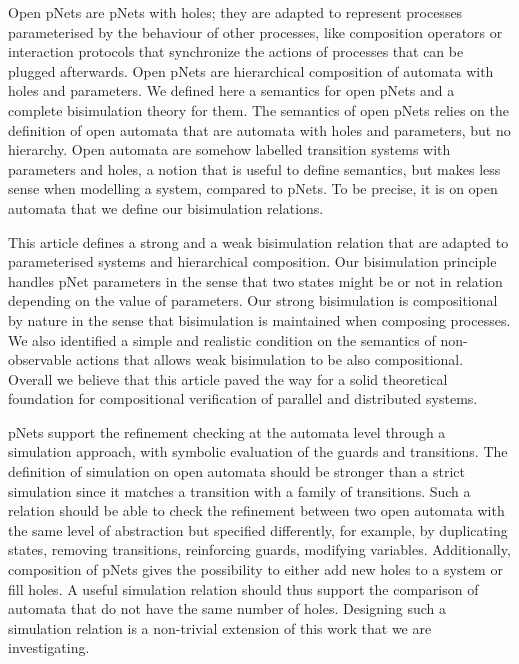 \documentclass{lmcs}
\begin{document}
Open pNets are pNets with holes; they are adapted to represent processes parameterised by the behaviour of other processes, like composition operators or interaction 
protocols that synchronize the actions of processes that can be plugged afterwards. Open
pNets are hierarchical composition of automata with holes and parameters. We
defined here a semantics for open pNets and a complete bisimulation theory for them. 
The semantics of open pNets relies on the definition of open automata that are automata with holes and parameters, but no hierarchy. Open automata are somehow labelled transition systems with parameters and holes, a notion that is useful to define semantics, but makes less sense when modelling a system, compared to pNets. To be precise, it is on open automata that we define our bisimulation relations.

This article defines a strong and a weak bisimulation relation that are adapted to parameterised systems and hierarchical composition. Our bisimulation principle handles pNet parameters in the sense that two states might be or not in relation depending on the value of parameters. Our strong  bisimulation is compositional by nature in the sense that bisimulation is maintained when composing processes. We also identified a simple and realistic condition on the semantics of non-observable actions that allows weak bisimulation to be also compositional. Overall we believe that this article paved the way for a solid theoretical foundation for compositional verification of parallel and distributed systems.

pNets support the refinement checking at the automata level through a simulation approach, with symbolic evaluation of
the guards and transitions. 
 The definition of simulation on open automata should be  stronger than a strict simulation since it matches a transition with a family of transitions. Such a relation should be able to check the refinement between two open automata with the same level of abstraction but specified differently, for example, by duplicating states, removing transitions, reinforcing guards, modifying variables. Additionally, composition of 
pNets gives the possibility to either add new holes to a system or  fill holes. A useful simulation relation  should thus support the  comparison of automata that do not have the same number of holes. Designing such a simulation relation is a non-trivial extension of this work that we are investigating.
\end{document}

